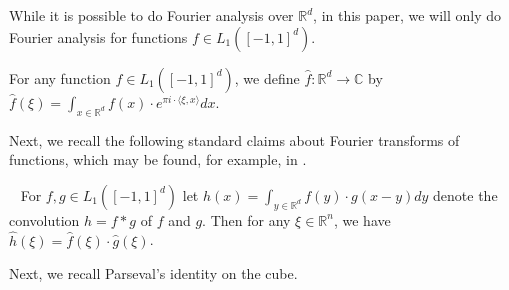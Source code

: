 


While it is possible 
to do Fourier analysis over $\mathbb{R}^d$, 
in this paper, we will only do Fourier analysis for functions $f \in  L_1([-1,1]^d)$.  
\begin{definition}
For any function $f \in L_1([-1,1]^d)$,
we define
$\widehat{f}: \mathbb{R}^d \rightarrow \mathbb{C}$
by
$
\widehat{f}(\xi) = \int_{x \in \mathbb{R}^d} f(x) \cdot e^{ \pi i \cdot \langle \xi, x \rangle} dx.$
\end{definition}

Next, we recall the following standard claims about Fourier transforms of functions, which may be found,
for example, in \citep{smith1995handbook}.
\begin{claim}~\label{clm:convolution}
For $f,g \in L_1([-1,1]^d)$  let   
$
{h}(x) = \int_{y \in \mathbb{R}^d} f(y) \cdot g(x-y) dy
$ denote the convolution $h = f \ast g$ of $f$ and $g$.
Then for any $\xi \in \mathbb{R}^n$, we have $\widehat{h}(\xi) = \widehat{f}(\xi) \cdot \widehat{g}(\xi)$. 
\end{claim}

Next, we recall Parseval's identity on the cube.

